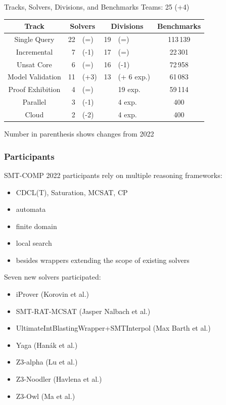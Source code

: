 \documentclass[table]{beamer}
\begin{document}
\begin{frame}{Tracks, Solvers, Divisions, and Benchmarks}
  Teams: 25 (+4) %
  \bigskip

  \begin{tabular}{c|r@{}l|r@{}l|c}
    Track & \multicolumn{2}{c|}{Solvers} & \multicolumn{2}{c|}{Divisions}  & Benchmarks \\
    \hline
    Single Query  &  22&(=)  & 19&(=)  & 113\,139 \\
    Incremental &  7&(-1)   & 17&(=)  & 22\,301   \\
    Unsat Core  &  6&(=)   & 16&(-1)  & 72\,958  \\
    Model Validation  &  11&(+3)    &  13& (+ 6 exp.)  & 61\,083  \\
    Proof Exhibition  &  4&(=)    &  & 19 exp.  & 59\,114  \\
    \hline
    Parallel &   3&(-1)      &   &4 exp.  & 400 \\
    Cloud & 2&(-2)      &  &4 exp.  & 400 \\

  \end{tabular}
  \bigskip

  Number in parenthesis shows changes from 2022
\end{frame}

\begin{frame}
  \frametitle{Participants}

  SMT-COMP 2022 participants rely on multiple reasoning frameworks:
  \begin{itemize}
  \item CDCL(T), Saturation, MCSAT, CP
  \item automata
  \item finite domain
  \item local search
  \item besides wrappers extending the scope of existing solvers
  \end{itemize}

  \bigskip
  Seven new solvers participated:
  \begin{itemize}
\item iProver {\footnotesize (Korovin et al.)}
\item SMT-RAT-MCSAT {\footnotesize (Jasper Nalbach et al.)}
\item UltimateIntBlastingWrapper+SMTInterpol {\footnotesize (Max Barth et al.)}
\item Yaga {\footnotesize (Hanák et al.)}
\item Z3-alpha {\footnotesize (Lu et al.)}
\item Z3-Noodler {\footnotesize (Havlena et al.)}
\item Z3-Owl {\footnotesize (Ma et al.)}
\end{itemize}

\end{frame}
\end{document}
